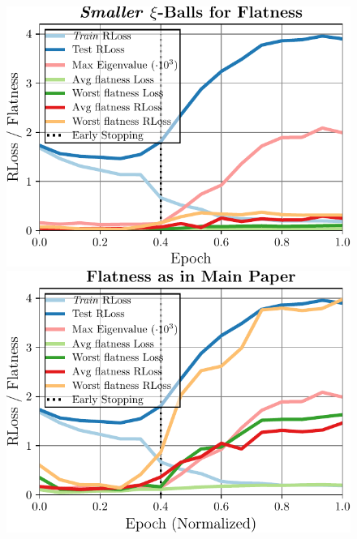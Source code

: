 \begin{figure}[t]
	\centering
	\vspace*{-0.2cm}
	\begin{minipage}[t]{0.31\textwidth}
		\includegraphics[width=\textwidth]{plots_supp_flatness_epochs_small}
	\end{minipage}
	\hspace*{2px}
	\begin{minipage}[t]{0.31\textwidth}
		\includegraphics[width=\textwidth]{plots_supp_flatness_epochs}
	\end{minipage}
	\hspace*{2px}
	\begin{minipage}[t]{0.31\textwidth}

\end{minipage}
\end{figure}

